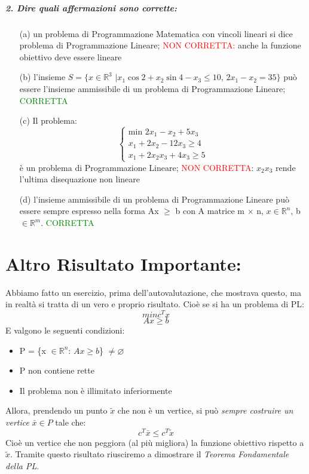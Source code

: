 \subparagraph{2. Dire quali affermazioni sono corrette:}
\begin{itemize}
    \item[(a)] un problema di Programmazione Matematica con vincoli lineari si dice problema di Programmazione Lineare; \textcolor{red}{NON CORRETTA:} anche la funzione obiettivo deve essere lineare
    \item[(b)] l’insieme $S = \{x \in \mathbb{R}^3$ $| x_1 \cos2 + x_2\sin4 - x_3 \leq 10$, \hspace{0.05cm} $2x_1 - x_2 = 35\}$ può essere l'insieme ammissibile di un problema di Programmazione Lineare; \textcolor{green}{CORRETTA}
    \item[(c)] Il problema:
    \begin{equation*}
        \begin{cases}
            \text{min $2x_1 - x_2 + 5x_3$}\\
            \text{$x_1 + 2x_2 - 12x_3 \geq 4$}\\
            \text{$x_1 + 2 x_2 x_3 + 4x_3 \geq 5$}
        \end{cases}
    \end{equation*}
    è un problema di Programmazione Lineare; \textcolor{red}{NON CORRETTA}: $x_2 x_3$ rende l'ultima disequazione non lineare
    \item[(d)] l’insieme ammissibile di un problema di Programmazione Lineare può essere sempre espresso nella forma Ax $\geq$ b con A matrice m $\times$ n, $x \in \mathbb{R}^n$, b $\in \mathbb{R}^m$. \textcolor{green}{CORRETTA}
\end{itemize}




\section{Altro Risultato Importante:}
Abbiamo fatto un esercizio, prima dell'autovalutazione, che mostrava questo, ma in realtà si tratta di un vero e proprio risultato. Cioè se si ha un problema di PL:
\begin{equation*}
    min c^Tx
\end{equation*}
\begin{equation*}
    Ax \geq b
\end{equation*}
E valgono le seguenti condizioni:
\begin{itemize}
    \item P = \{x $\in \mathbb{R}^n$: $Ax \geq b$\} $\neq \varnothing$
    \item P non contiene rette
    \item Il problema non è illimitato inferiormente
\end{itemize}
Allora, prendendo un punto $\tilde{x}$ che non è un vertice, si può \textit{sempre costruire un vertice} $\bar{x} \in P$ tale che:
\begin{equation*}
    c^T\bar{x} \leq c^T\tilde{x}
\end{equation*}
Cioè un vertice che non peggiora (al più migliora) la funzione obiettivo rispetto a $\tilde{x}$. Tramite questo risultato riusciremo a dimostrare il \textit{Teorema Fondamentale della PL}.



